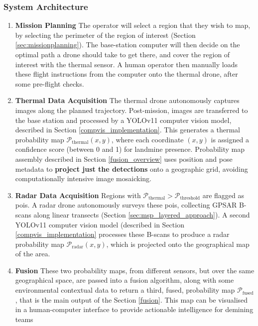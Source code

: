 

    \subsubsection{System Architecture} \label{compvis_methods}
    
        \begin{enumerate}
        
            \item \textbf{Mission Planning} The operator will select a region that they wish to map, by selecting the perimeter of the region of interest (Section \ref{sec:missionplanning}). The base-station computer will then decide on the optimal path a drone should take to get there, and cover the region of interest with the thermal sensor. A human operator then manually loads these flight instructions from the computer onto the thermal drone, after some pre-flight checks.
            
            \item \textbf{Thermal Data Acquisition} The thermal drone autonomously captures images along the planned trajectory. Post-mission, images are transferred to the base station and processed by a YOLOv11 computer vision model, described in Section \ref{compvis_implementation}. This generates a thermal probability map \(\mathcal{P}_{\text{thermal}}(x,y)\), where each coordinate \((x,y)\) is assigned a confidence score (between 0 and 1) for landmine presence. Probability map assembly described in Section \ref{fusion_overview} uses position and pose metadata to \textbf{project just the detections} onto a geographic grid, avoiding computationally intensive image mosaicking.
            
            \item \textbf{Radar Data Acquisition} Regions with \(\mathcal{P}_{\text{thermal}} > \mathcal{P}_{\text{threshold}}\) are flagged as \gls{poi}s. A radar drone autonomously surveys these \gls{poi}s, collecting GPSAR B-scans along linear transects (Section \ref{sec:msp_layered_approach}). A second YOLOv11 computer vision model (described in Section \ref{compvis_implementation} processes these B-scans to produce a radar probability map \(\mathcal{P}_{\text{radar}}(x,y)\), which is projected onto the geographical map of the area.
            
            \item \textbf{Fusion} These two probability maps, from different sensors, but over the same geographical space, are passed into a fusion algorithm, along with some environmental contextual data to return a third, fused, probability map $\mathcal{P}_{\text{fused}}$, that is the main output of the Section \ref{fusion}. This map can be visualised in a human-computer interface to provide actionable intelligence for demining teams
            
        \end{enumerate}


